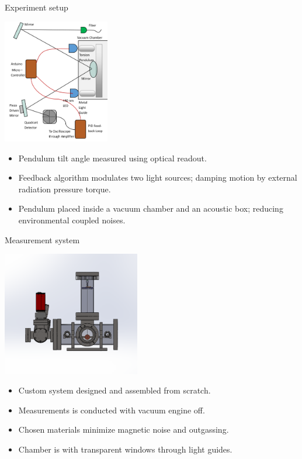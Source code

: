 \documentclass{beamer}
\begin{document}
\begin{frame}{Experiment setup}
	\begin{center}		
			\includegraphics[width=0.35\textwidth,keepaspectratio]{setup cropped.png}
	\end{center}
	\begin{itemize}
		\item Pendulum tilt angle measured using optical readout.
		\item Feedback algorithm modulates two light sources; damping motion by external radiation pressure torque.
		\item Pendulum placed inside a vacuum chamber and an acoustic box; reducing environmental coupled noises.

	\end{itemize}
	
\end{frame}

\begin{frame}{Measurement system}
	\begin{center}		
		\includegraphics[width=0.45\textwidth,keepaspectratio]{total_chamber.png}
	\end{center}
	\begin{itemize}
		\item Custom system designed and assembled from scratch.
		\item Measurements is conducted with vacuum engine off.
		\item Chosen materials minimize magnetic noise and outgassing.
		\item Chamber is with transparent windows through light guides.


		
	\end{itemize}	
\end{frame}
\end{document}
